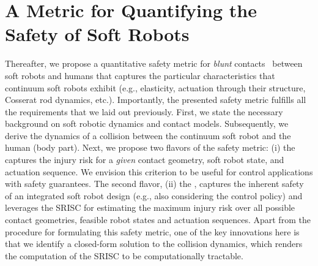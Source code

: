 \section{A Metric for Quantifying the Safety of Soft Robots}
Thereafter, we propose a quantitative safety metric for \emph{blunt} contacts~\citep{haddadin2011safe} between soft robots and humans that captures the particular characteristics that continuum soft robots exhibit (e.g., elasticity, actuation through their structure, Cosserat rod dynamics, etc.).
Importantly, the presented safety metric fulfills all the requirements that we laid out previously. %
First, we state the necessary background on soft robotic dynamics and contact models. Subsequently, we derive the dynamics of a collision between the continuum soft robot and the human (body part).
Next, we propose two flavors of the safety metric: (i) the  captures the injury risk for a \emph{given} contact geometry, soft robot state, and actuation sequence. We envision this criterion to be useful for control applications with safety guarantees.
The second flavor, (ii) the , captures the inherent safety of an integrated soft robot design (e.g., also considering the control policy) and leverages the \gls{SRISC} for estimating the maximum injury risk over all possible contact geometries, feasible robot states and actuation sequences.
Apart from the procedure for formulating this safety metric, one of the key innovations here is that we identify a closed-form solution to the collision dynamics, which renders the computation of the \gls{SRISC} to be computationally tractable.

